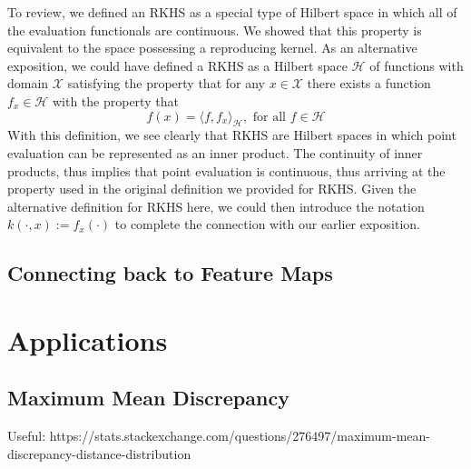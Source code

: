 \documentclass[12pt]{article}
\begin{document}
 To review, we defined an RKHS as a special type of Hilbert space in which all of the evaluation functionals are continuous. We showed that this property is equivalent to the space possessing 
 a reproducing kernel. As an alternative exposition, we could have defined a RKHS as a Hilbert space $\mathcal{H}$ of functions with domain $\mathcal{X}$ 
 satisfying the property that for any $x \in \mathcal{X}$ there exists a function $f_x \in \mathcal{H}$ with the property that 
 \[f(x) = \langle f, f_x \rangle_{\mathcal{H}}, \text{ for all } f \in \mathcal{H} \]
 With this definition, we see clearly that RKHS are Hilbert spaces in which point evaluation can be represented as an inner product. The continuity of inner products, thus implies that point evaluation 
 is continuous, thus arriving at the property used in the original definition we provided for RKHS. Given the alternative definition for RKHS here, we could then introduce the notation 
 $k(\cdot, x) := f_x(\cdot)$ to complete the connection with our earlier exposition. 
 

\subsection{Connecting back to Feature Maps}


\section{Applications}
\subsection{Maximum Mean Discrepancy}
Useful: https://stats.stackexchange.com/questions/276497/maximum-mean-discrepancy-distance-distribution
\end{document}
